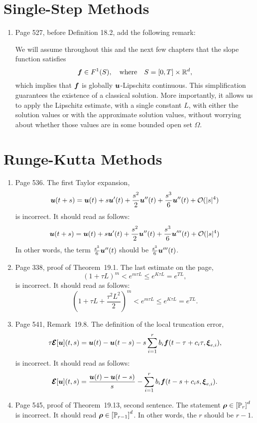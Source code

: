 \documentclass{book}
\begin{document}
\chapter{Single-Step Methods}

	\begin{enumerate}
	\item
Page 527, before Definition 18.2, add the following remark:

	\medskip
	
	\begin{rem}
We will assume throughout this and the next few chapters that the slope function satisfies 
	\[
\boldsymbol{f}\in F^1(S), \quad  \mbox{where} \quad  S = [0,T]\times \mathbb R^d,
	\]
which implies that $\boldsymbol{f}$ is globally $\boldsymbol{u}$-Lipschitz continuous. This simplification guarantees the existence of a classical solution. More importantly, it allows us to apply the Lipschitz estimate, with a single constant $L$, with either the solution values or with the approximate solution values, without worrying about whether those values are in some bounded open set $\Omega$. 
	\end{rem}


  
	\end{enumerate}
	
\chapter{Runge-Kutta Methods}

	\begin{enumerate}
	\item
Page 536. The first Taylor expansion,
	\[
  \boldsymbol{u}(t+s) = \boldsymbol{u}(t) + s \boldsymbol{u}'(t) + \frac{s^2}{2} \boldsymbol{u}''(t) + \frac{s^3}6 \boldsymbol{u}''(t) + {\mathcal O}(|s|^4)
	\] 
is incorrect. It should read as follows:
	\[
\boldsymbol{u}(t+s) = \boldsymbol{u}(t) + s \boldsymbol{u}'(t) + \frac{s^2}{2} \boldsymbol{u}''(t) + \frac{s^3}6 \boldsymbol{u}'''(t) + {\mathcal O}(|s|^4)
	\] 
In other words, the term $\frac{s^3}6 \boldsymbol{u}''(t)$ should be $\frac{s^3}6 \boldsymbol{u}'''(t)$.	
	
	\item
Page 338, proof of Theorem~19.1. The last estimate on the page,
	\[
(1+\tau L)^m < e^{m \tau L} \le e^{K\tau L}  = e^{TL},
	\]
is incorrect. It should read as follows:
	\[
\left(1+\tau L +\frac{\tau^2 L^2}{2}\right)^m < e^{m \tau L} \le e^{K\tau L}  = e^{TL} .
	\]
	
	\item
Page 541, Remark~19.8. The definition of the local truncation error,
\[
  \tau \pmb{\mathcal{E}}[\boldsymbol{u}](t,s) =  \boldsymbol{u}(t) - \boldsymbol{u}(t-s) - s\sum_{i=1}^r b_i \boldsymbol{f}(t-\tau+c_i \tau,{\boldsymbol \xi}_{e,i}) ,
\]
is incorrect. It should read as follows:
	\[
 \pmb{\mathcal{E}}[\boldsymbol{u}](t,s) =  \frac{\boldsymbol{u}(t) - \boldsymbol{u}(t-s)}{s} - \sum_{i=1}^r b_i \boldsymbol{f}(t-s+c_i s,{\boldsymbol \xi}_{e,i}) .
	\]
	
	\item
Page 545, proof of Theorem~19.13, second sentence. The statement $\boldsymbol{\rho }\in \left[ {\mathbb P}_r\right]^d$ is incorrect.  It should read $\boldsymbol{\rho }\in \left[ {\mathbb P}_{r-1}\right]^d$. In other words, the $r$ should be $r-1$.
	
	\end{enumerate}
	
\end{document}
